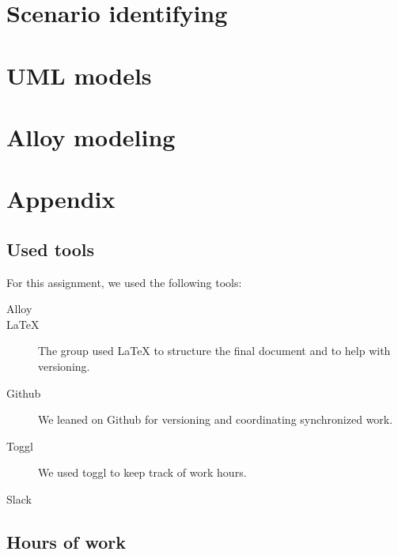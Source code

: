 \documentclass{article}
\begin{document}
	\newpage
	\section{Scenario identifying}
	
		

	\newpage
	\section{UML models}
	

	\newpage
	\section{Alloy modeling}

	\newpage
	\section{Appendix}
		\listoffigures
		\listoftables
		
		\subsection{Used tools}
		For this assignment, we used the following tools:
		
		\begin{description}
			\item [Alloy]
			\item [LaTeX] The group used LaTeX to structure the final document and to help with versioning.
			\item [Github] We leaned on Github for versioning and coordinating synchronized work.
			\item [Toggl] We used toggl to keep track of work hours.
			\item [Slack]  
			
		\end{description}
		
		\subsection{Hours of work}
\end{document}
